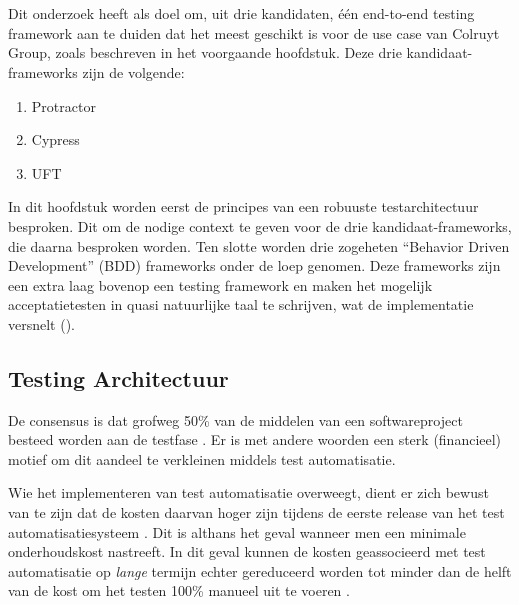 \chapter{}
\label{ch:stand-van-zaken}



Dit onderzoek heeft als doel om, uit drie kandidaten, één end-to-end testing framework aan te duiden dat het meest geschikt is voor de use case van Colruyt Group, zoals beschreven in het voorgaande hoofdstuk. Deze drie kandidaat-frameworks zijn de volgende:

\begin{enumerate}
    \item Protractor
    \item Cypress
    \item UFT
\end{enumerate}

In dit hoofdstuk worden eerst de principes van een robuuste testarchitectuur besproken. Dit om de nodige context te geven voor de drie kandidaat-frameworks, die daarna besproken worden. Ten slotte worden drie zogeheten ``Behavior Driven Development'' (BDD) frameworks onder de loep genomen. Deze frameworks zijn een extra laag bovenop een testing framework en maken het mogelijk acceptatietesten in quasi natuurlijke taal te schrijven, wat de implementatie versnelt (\cite{Diepenbeck2014}).

\section{Testing Architectuur}

De consensus is dat grofweg 50\% van de middelen van een softwareproject besteed worden aan de testfase \cite{Kasurinen2010,Tsai2001,Dadwal2018}. Er is met andere woorden een sterk (financieel) motief om dit aandeel te verkleinen middels test automatisatie.

Wie het implementeren van test automatisatie overweegt, dient er zich bewust van te zijn dat de kosten daarvan hoger zijn tijdens de eerste release van het test automatisatiesysteem \autocite{Fewster2001} \autocite{Kumar2016}. Dit is althans het geval wanneer men een minimale onderhoudskost nastreeft. In dit geval kunnen de kosten geassocieerd met test automatisatie op \emph{lange} termijn echter gereduceerd worden tot minder dan de helft van de kost om het testen 100\% manueel uit te voeren \autocite{Kumar2016}.

